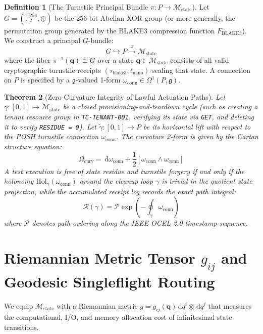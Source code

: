 \documentclass[10pt,twoside,openany]{book}
\theoremstyle{plain}
\newtheorem{theorem}{Theorem}[chapter]
\theoremstyle{definition}
\newtheorem{definition}[theorem]{Definition}
\theoremstyle{remark}
\newcommand{\Rec}{\mathcal{R}}
\newcommand{\Man}{\mathcal{M}}
\newcommand{\F}{\mathbb{F}}
\newcommand{\dd}{\,\mathrm{d}}
\begin{document}
\begin{definition}[The Turnstile Principal Bundle $\pi: P \to \Man_{\mathrm{state}}$]
Let $G = (\F_2^{256}, \oplus)$ be the 256-bit Abelian XOR group (or more generally, the permutation group generated by the BLAKE3 compression function $F_{\mathrm{BLAKE3}}$). We construct a principal $G$-bundle:
\begin{equation}
G \hookrightarrow P \xrightarrow{\;\pi\;} \Man_{\mathrm{state}}
\end{equation}
where the fiber $\pi^{-1}(\mathbf{q}) \cong G$ over a state $\mathbf{q} \in \Man_{\mathrm{state}}$ consists of all valid cryptographic turnstile receipts $(\tau_{\mathrm{blake3}}, t_{\mathrm{nano}})$ sealing that state. A connection on $P$ is specified by a $\mathfrak{g}$-valued 1-form $\omega_{\mathrm{conn}} \in \Omega^1(P, \mathfrak{g})$.
\end{definition}

\begin{theorem}[Zero-Curvature Integrity of Lawful Actuation Paths]
Let $\gamma: [0, 1] \to \Man_{\mathrm{state}}$ be a closed provisioning-and-teardown cycle (such as creating a tenant resource group in \texttt{TC-TENANT-001}, verifying its state via \texttt{GET}, and deleting it to verify \texttt{RESIDUE = 0}). Let $\tilde{\gamma}: [0, 1] \to P$ be its horizontal lift with respect to the POSH turnstile connection $\omega_{\mathrm{conn}}$. The curvature 2-form is given by the Cartan structure equation:
\begin{equation}
\Omega_{\mathrm{curv}} = \dd\omega_{\mathrm{conn}} + \frac{1}{2}[\omega_{\mathrm{conn}} \wedge \omega_{\mathrm{conn}}]
\end{equation}
A test execution is free of state residue and turnstile forgery if and only if the holonomy $\mathrm{Hol}_{\gamma}(\omega_{\mathrm{conn}})$ around the cleanup loop $\gamma$ is trivial in the quotient state projection, while the accumulated receipt log records the exact path integral:
\begin{equation}
\Rec(\gamma) = \mathcal{P}\exp\!\left( -\oint_{\gamma} \omega_{\mathrm{conn}} \right)
\end{equation}
where $\mathcal{P}$ denotes path-ordering along the IEEE OCEL 2.0 timestamp sequence.
\end{theorem}

\section{Riemannian Metric Tensor $g_{ij}$ and Geodesic Singleflight Routing}
We equip $\Man_{\mathrm{state}}$ with a Riemannian metric $g = g_{ij}(\mathbf{q})\dd q^i \otimes \dd q^j$ that measures the computational, I/O, and memory allocation cost of infinitesimal state transitions.
\end{document}
